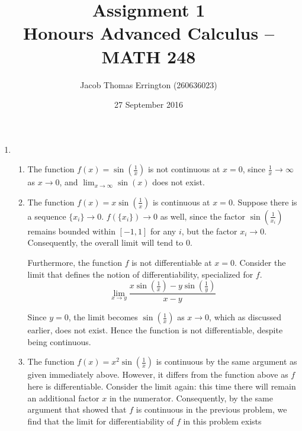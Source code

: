 \documentclass[letterpaper,11pt]{article}
\author{Jacob Thomas Errington (260636023)}
\title{Assignment 1\\Honours Advanced Calculus -- MATH 248}
\date{27 September 2016}
\begin{document}
\maketitle

\begin{enumerate}
    \item
        \begin{enumerate}
            \item
                The function $f(x) = \sin{\left(\frac{1}{x}\right)}$ is not
                continuous at $x = 0$, since $\frac{1}{x} \to \infty$ as
                $x \to 0$, and $\lim_{x\to\infty} {\sin(x)}$ does not exist.

            \item
                The function $f(x) = x \sin{(\frac{1}{x})}$ is continuous at
                $x = 0$. Suppose there is a sequence $\{x_i\} \to 0$.
                $f(\{x_i\}) \to 0$ as well, since the factor
                $\sin{(\frac{1}{x_i})}$ remains bounded within $[-1, 1]$ for
                any $i$, but the factor $x_i \to 0$. Consequently, the overall
                limit will tend to $0$.

                Furthermore, the function $f$ is not differentiable at $x=0$.
                Consider the limit that defines the notion of
                differentiability, specialized for $f$.
                \begin{equation*}
                    \lim_{x\to y}{
                        \frac
                        {x \sin{(\frac{1}{x})} - y \sin{(\frac{1}{y})}}
                        {x - y}
                    }
                \end{equation*}

                Since $y=0$, the limit becomes $\sin{(\frac{1}{x})}$ as
                $x \to 0$, which as discussed earlier, does not exist. Hence
                the function is not differentiable, despite being continuous.

            \item
                The function $f(x) = x^2 \sin{(\frac{1}{x})}$ is continuous by
                the same argument as given immediately above. However, it
                differs from the function above as $f$ here is differentiable.
                Consider the limit again: this time there will remain an
                additional factor $x$ in the numerator. Consequently, by the
                same argument that showed that $f$ is continuous in the
                previous problem, we find that the limit for differentiability
                of $f$ in this problem exists
        \end{enumerate}


\end{enumerate}
\end{document}
